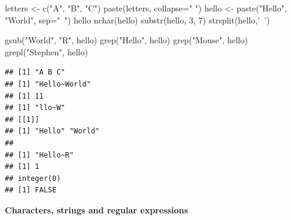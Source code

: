 \documentclass[a4paper]{book}
\newenvironment{Shaded}{}{}
\newcommand{\KeywordTok}[1]{\textcolor[rgb]{0.00,0.00,1.00}{{#1}}}
\newcommand{\DataTypeTok}[1]{{#1}}
\newcommand{\DecValTok}[1]{{#1}}
\newcommand{\StringTok}[1]{\textcolor[rgb]{0.00,0.50,0.50}{{#1}}}
\newcommand{\NormalTok}[1]{{#1}}
\newlength{\leftbarwidth}
\newlength{\leftbarsep}
\newcommand*{\leftbarcolorcmd}{\color{darkgray}}%
\renewenvironment{leftbar}{%
    \def\FrameCommand{{\leftbarcolorcmd{\vrule width \leftbarwidth\relax\hspace {\leftbarsep}}}}%
    \MakeFramed {\advance \hsize -\width \FrameRestore }%
}{%
    \endMakeFramed
}
\renewenvironment{Shaded}
{\vspace{0em}\begin{leftbar}\begin{snugshade}}
{\end{snugshade}\end{leftbar}\vspace{0pt}}
\begin{document}
\begin{Shaded}
\begin{Highlighting}[]
\NormalTok{letters <-}\StringTok{ }\KeywordTok{c}\NormalTok{(}\StringTok{"A"}\NormalTok{, }\StringTok{"B"}\NormalTok{, }\StringTok{"C"}\NormalTok{)}
\KeywordTok{paste}\NormalTok{(letters, }\DataTypeTok{collapse=}\StringTok{" "}\NormalTok{)}
\NormalTok{hello <-}\StringTok{ }\KeywordTok{paste}\NormalTok{(}\StringTok{"Hello"}\NormalTok{, }\StringTok{"World"}\NormalTok{, }\DataTypeTok{sep=}\StringTok{"~"}\NormalTok{)}
\NormalTok{hello}
\KeywordTok{nchar}\NormalTok{(hello)}
\KeywordTok{substr}\NormalTok{(hello, }\DecValTok{3}\NormalTok{, }\DecValTok{7}\NormalTok{)}
\KeywordTok{strsplit}\NormalTok{(hello,}\StringTok{'~'}\NormalTok{)}

\KeywordTok{gsub}\NormalTok{(}\StringTok{"World"}\NormalTok{, }\StringTok{"R"}\NormalTok{, hello)}
\KeywordTok{grep}\NormalTok{(}\StringTok{"Hello"}\NormalTok{, hello)}
\KeywordTok{grep}\NormalTok{(}\StringTok{"Mouse"}\NormalTok{, hello)}
\KeywordTok{grepl}\NormalTok{(}\StringTok{"Stephen"}\NormalTok{, hello)}
\end{Highlighting}
\end{Shaded}

\begin{verbatim}
## [1] "A B C"
## [1] "Hello~World"
## [1] 11
## [1] "llo~W"
## [[1]]
## [1] "Hello" "World"
## 
## [1] "Hello~R"
## [1] 1
## integer(0)
## [1] FALSE
\end{verbatim}

\textbf{Characters, strings and regular expressions}
\end{document}
